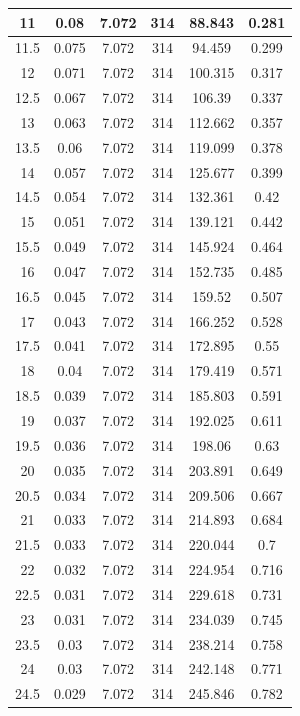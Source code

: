 \documentclass[10pt,a4paper]{article}
\begin{document}
\begin{flushleft}
\begin{itemize}
\begin{table}[H]
{\begin{subtable}[t]{.6\textwidth}
\begin{tabular}{|c|c|c|c|c|c|}
\hline
11 & 0.08 & 7.072 & 314 & 88.843 & 0.281 \\ 
\hline
11.5 & 0.075 & 7.072 & 314 & 94.459 & 0.299 \\ 
\hline
12 & 0.071 & 7.072 & 314 & 100.315 & 0.317 \\ 
\hline
12.5 & 0.067 & 7.072 & 314 & 106.39 & 0.337 \\ 
\hline
13 & 0.063 & 7.072 & 314 & 112.662 & 0.357 \\ 
\hline
13.5 & 0.06 & 7.072 & 314 & 119.099 & 0.378 \\ 
\hline
14 & 0.057 & 7.072 & 314 & 125.677 & 0.399 \\ 
\hline
14.5 & 0.054 & 7.072 & 314 & 132.361 & 0.42 \\ 
\hline
15 & 0.051 & 7.072 & 314 & 139.121 & 0.442 \\ 
\hline
15.5 & 0.049 & 7.072 & 314 & 145.924 & 0.464 \\ 
\hline
16 & 0.047 & 7.072 & 314 & 152.735 & 0.485 \\ 
\hline
16.5 & 0.045 & 7.072 & 314 & 159.52 & 0.507 \\ 
\hline
17 & 0.043 & 7.072 & 314 & 166.252 & 0.528 \\ 
\hline
17.5 & 0.041 & 7.072 & 314 & 172.895 & 0.55 \\ 
\hline
18 & 0.04 & 7.072 & 314 & 179.419 & 0.571 \\ 
\hline
18.5 & 0.039 & 7.072 & 314 & 185.803 & 0.591 \\ 
\hline
19 & 0.037 & 7.072 & 314 & 192.025 & 0.611 \\ 
\hline
19.5 & 0.036 & 7.072 & 314 & 198.06 & 0.63 \\ 
\hline
20 & 0.035 & 7.072 & 314 & 203.891 & 0.649 \\ 
\hline
20.5 & 0.034 & 7.072 & 314 & 209.506 & 0.667 \\ 
\hline
21 & 0.033 & 7.072 & 314 & 214.893 & 0.684 \\ 
\hline
21.5 & 0.033 & 7.072 & 314 & 220.044 & 0.7 \\ 
\hline
22 & 0.032 & 7.072 & 314 & 224.954 & 0.716 \\ 
\hline
22.5 & 0.031 & 7.072 & 314 & 229.618 & 0.731 \\ 
\hline
23 & 0.031 & 7.072 & 314 & 234.039 & 0.745 \\ 
\hline
23.5 & 0.03 & 7.072 & 314 & 238.214 & 0.758 \\ 
\hline
24 & 0.03 & 7.072 & 314 & 242.148 & 0.771 \\ 
\hline
24.5 & 0.029 & 7.072 & 314 & 245.846 & 0.782 \\ 

\end{tabular}
\end{subtable}}
\end{table}
\end{itemize}
\end{flushleft}
\end{document}
